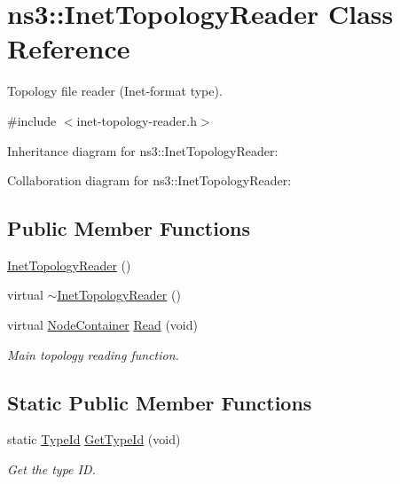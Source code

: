 \hypertarget{classns3_1_1InetTopologyReader}{}\section{ns3\+:\+:Inet\+Topology\+Reader Class Reference}
\label{classns3_1_1InetTopologyReader}


Topology file reader (Inet-\/format type).  




{\ttfamily \#include $<$inet-\/topology-\/reader.\+h$>$}



Inheritance diagram for ns3\+:\+:Inet\+Topology\+Reader\+:


Collaboration diagram for ns3\+:\+:Inet\+Topology\+Reader\+:
\subsection*{Public Member Functions}
\begin{DoxyCompactItemize}
\item 
\hyperlink{classns3_1_1InetTopologyReader_a7cc79bc99e3785e32e53401e966079e1}{Inet\+Topology\+Reader} ()
\item 
virtual \hyperlink{classns3_1_1InetTopologyReader_a5ee480cd54633b71eee103b6a1dcd802}{$\sim$\+Inet\+Topology\+Reader} ()
\item 
virtual \hyperlink{classns3_1_1NodeContainer}{Node\+Container} \hyperlink{classns3_1_1InetTopologyReader_adde06adec25a365b75c966d7ee97b932}{Read} (void)
\begin{DoxyCompactList}\small\item\em Main topology reading function. \end{DoxyCompactList}\end{DoxyCompactItemize}
\subsection*{Static Public Member Functions}
\begin{DoxyCompactItemize}
\item 
static \hyperlink{classns3_1_1TypeId}{Type\+Id} \hyperlink{classns3_1_1InetTopologyReader_accb7528ba3d5c75ec067c228257aa5a4}{Get\+Type\+Id} (void)
\begin{DoxyCompactList}\small\item\em Get the type ID. \end{DoxyCompactList}\end{DoxyCompactItemize}
